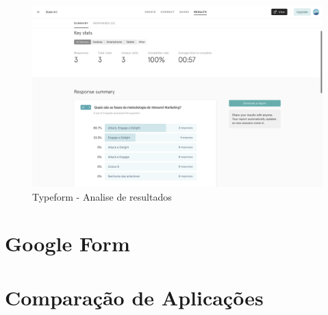 \begin{figure}[ht!]
	\begin{center}
		\includegraphics[width=1\textwidth]{img/tf/tf-question-results}
		\caption{Typeform - Analise de resultados}
		\label{fig:tf-question-results}
	\end{center}
\end{figure}


\newpage
\section{Google Form}
\label{googleform}


\newpage
\section{Comparação de Aplicações}
\label{googleform}

\blankpage

\glsresetall



